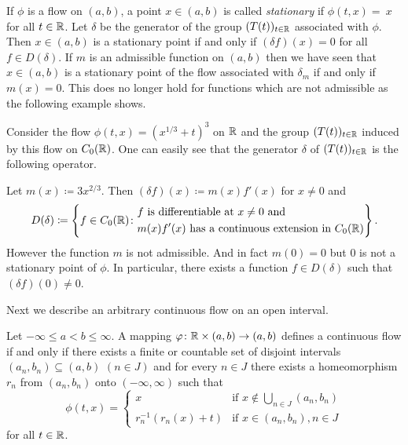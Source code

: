 \begin{remark}\label{rem:b2-3.19}
%
If\/ $\phi$ is a flow on $(a,b)$, a point $x \in (a,b)$ is called \emph{stationary} if\/ $\phi(t,x) =~x$ for all $t \in \mathbb{R}$.
Let $\delta$ be the generator of the group $(T(t))_{t \in \mathbb{R}}$ associated with $\phi$.
Then $x \in (a,b)$ is a stationary point if and only if\/ $(\delta f)(x) = 0$ for all $f \in D(\delta)$.
If\/ $m$ is an admissible function on $(a,b)$ then we have seen that $x \in (a,b)$ is a stationary point of the flow associated with $\delta_{m}$ if and only if\/ $m(x) = 0$.
This does no longer hold for functions which are not admissible as the following example shows.
\end{remark}
\begin{example}\label{ex:b2-3.20}
%
Consider the flow $\phi(t,x) = (x^{1/3} + t)^{3}$ on $\mathbb{R}$ and the group $(T(t))_{t \in \mathbb{R}}$ induced by this flow on $C_{0}(\mathbb{R})$.
One can easily see that the generator $\delta$ of\/ $(T(t))_{t \in \mathbb{R}}$ is the following operator.

Let $m(x) \coloneq 3x^{2/3}$.
Then $(\delta f)(x) \coloneq m(x)f'(x)$ for $x \neq 0$ and 
\begin{equation*}
D(\delta) \coloneq 
\left\{ f \in C_{0}(\mathbb{R}) \colon 
\begin{aligned}
	&f \text{ is differentiable at } x \neq 0 \text{ and } \\
	&m(x)f'(x) \text{ has a continuous extension in } C_{0}(\mathbb{R})
\end{aligned}
\right\}.
\end{equation*}
However the function $m$ is not admissible.
And in fact $m(0) = 0$ but $0$ is not a stationary point of\/ $\phi$.
In particular, there exists a function $f \in D(\delta)$ such that $(\delta f)(0) \neq 0$.
\end{example}
Next we describe an arbitrary continuous flow on an open interval.
\begin{proposition}\label{prop:b2-3.21}
%
Let $-\infty \leq a < b \leq \infty$.
A mapping $\phi \colon \R \times (a,b) \to (a,b)$ defines a continuous flow if and only if there exists a finite or countable set of disjoint intervals $(a_{n},b_{n}) \subseteq (a,b)$ $(n \in J)$ and for every $n \in J$ there exists a homeomorphism $r_{n}$ from $(a_{n},b_{n})$ onto $(-\infty,\infty)$ such that
\begin{equation*}\label{eq:b2-flow}
\phi(t,x) = \begin{cases}
    x & \text{if } x \notin \bigcup_{n \in J} (a_{n},b_{n}) \\
    r_{n}^{-1}(r_{n}(x) + t) & \text{if } x \in (a_{n},b_{n}), n \in J
\end{cases}
\end{equation*}
for all $t \in \mathbb{R}$.
\end{proposition}
